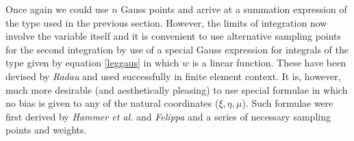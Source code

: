 \documentclass[10pt,b5paper,titlepage]{book}
\begin{document}
Once again we could use $ n $ Gauss points and arrive at a summation expression of
the type used in the previous section. However, the limits of integration now
involve the variable itself and it is convenient to use alternative sampling points
for the second integration by use of a special Gauss expression for integrals of
the type given by equation \eqref{leggaus} in which $ w $ is a linear function.
These have been devised by \textit{Radau} and used successfully in finite element context.
It is, however, much more desirable (and aesthetically pleasing) to use special
formulae in which no bias is given to any of the natural coordinates ($\xi, \eta, \mu$).
Such formulae were first derived by \textit{Hammer et al.} and \textit{Felippa}
and a series of necessary sampling points and weights.

\newpage
\begin{table}[h!]
    \centering
    \renewcommand{\arraystretch}{1.25}
\end{table}
\end{document}
